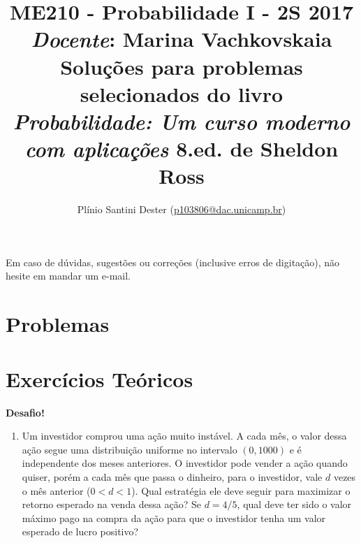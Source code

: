 


\title{	ME210 - Probabilidade I - 2S 2017\\
		{\large \textit{Docente}: Marina Vachkovskaia}\\[2mm]
		{\large Soluções para problemas selecionados do livro\\[-2mm]
        \textit{Probabilidade: Um curso moderno com aplicações}
        8.ed. de Sheldon Ross}\\
}
\author{Plínio Santini Dester (\url{p103806@dac.unicamp.br})}



\maketitle

Em caso de dúvidas, sugestões ou correções (inclusive erros de digitação), não hesite em mandar um e-mail.

\setcounter{section}{4}
\section{Problemas}

\newpage

\setcounter{section}{4}
\section{Exercícios Teóricos}


\vspace{10mm} {\LARGE \textbf{Desafio!}}
\begin{enumerate}
\item Um investidor comprou uma ação muito instável. A cada mês, o valor dessa ação segue uma distribuição uniforme no intervalo $(0,1000)$ e é independente dos meses anteriores. O investidor pode vender a ação quando quiser, porém a cada mês que passa o dinheiro, para o investidor, vale $d$ vezes o mês anterior ($0<d<1$). Qual estratégia ele deve seguir para maximizar o retorno esperado na venda dessa ação? Se $d=4/5$, qual deve ter sido o valor máximo pago na compra da ação para que o investidor tenha um valor esperado de lucro positivo?
\end{enumerate}

